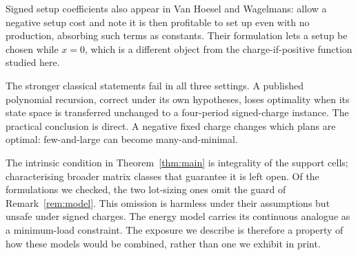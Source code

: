 \documentclass[3p,11pt]{elsarticle}
\theoremstyle{remark}
\theoremstyle{definition}
\begin{document}
Signed setup coefficients also appear in Van Hoesel and Wagelmans:
\cite{vhw93} allow a negative setup cost and note it is then profitable to set up even
with no production, absorbing such terms as constants. Their formulation lets a
setup be chosen while $x=0$, which is a different object from the charge-if-positive
function studied here.

The stronger classical statements fail in all three settings. A
published polynomial recursion, correct under its own hypotheses, loses optimality when
its state space is transferred unchanged to a four-period signed-charge instance. The
practical conclusion is direct. A negative fixed charge changes which plans are optimal:
few-and-large can become many-and-minimal.

The intrinsic condition in Theorem~\ref{thm:main} is integrality of the support cells;
characterising broader matrix classes that guarantee it is left open. Of the formulations
we checked, the two lot-sizing ones \cite{apr15,lcw01} omit the
guard of Remark~\ref{rem:model}. This omission is harmless under their assumptions but
unsafe under signed charges. The energy model \cite{raheli23} carries its continuous analogue as a
minimum-load constraint. The exposure we describe is therefore a property of how these models would be
combined, rather than one we exhibit in print.
\end{document}

